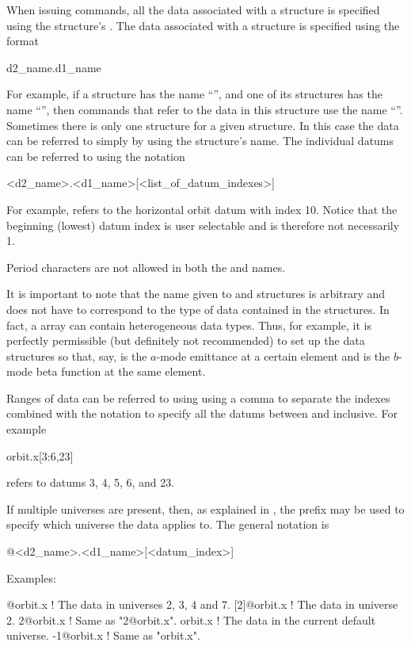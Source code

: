 When issuing \tao commands, all the
data associated with a  structure is specified using the
 structure's .  The data associated with a
 structure is specified using the format
\begin{example}
  d2_name.d1_name
\end{example}
For example, if a  structure has the
name ``'', and one of its  structures has the
name ``'', then \tao commands that refer to the data in this
 structure use the name ``''. Sometimes there
is only one  structure for a given 
structure. In this case the data can be referred to simply by using
the  structure's name. The individual datums can be
referred to using the notation
\begin{example}
  <d2_name>.<d1_name>[<list_of_datum_indexes>]
\end{example}
For example,  refers to the horizontal orbit datum
with index 10. Notice that the beginning (lowest) datum index is user
selectable and is therefore not necessarily 1. 

Period characters are not allowed in both the  and  names.

It is important to note that the name given to  and 
structures is arbitrary and does not have to correspond to the 
type of data contained in the 
structures. In fact, a  array can contain heterogeneous data types.
Thus, for example, it is perfectly permissible (but definitely not recommended) 
to set up the data structures so that, say,  
is the $a$-mode emittance at a certain element and 
is the $b$-mode beta function at the same element.

Ranges of data can be referred to using using a comma \vn{,} to
separate the indexes combined with the notation  to specify
all the datums between  and  inclusive. For example
\begin{example}
  orbit.x[3:6,23]
\end{example}
refers to datums 3, 4, 5, 6, and 23. 

If multiple universes are present, then, as explained in
, the prefix  may be used to specify which
universe the data applies to. The general notation is
\begin{example}
  @<d2_name>.<d1_name>[<datum_index>]
\end{example}
Examples:
\begin{example}
  [2:4,7]@orbit.x ! The  data in universes 2, 3, 4 and 7.
  [2]@orbit.x     ! The  data in universe 2. 
  2@orbit.x       ! Same as "2@orbit.x".
  orbit.x         ! The  data in the current default universe.
  -1@orbit.x      ! Same as "orbit.x".
\end{example}

